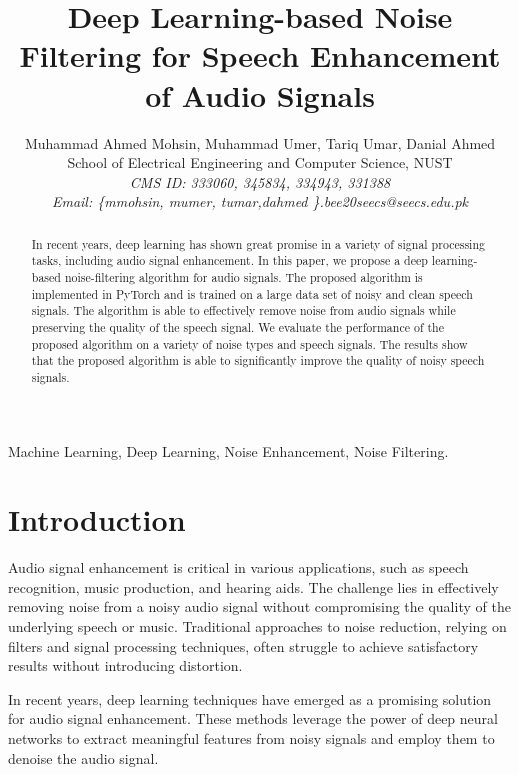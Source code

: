 \documentclass[conference]{IEEEtran}
\begin{document}
\title{Deep Learning-based Noise Filtering for Speech Enhancement of Audio Signals}

\author{Muhammad Ahmed Mohsin, Muhammad Umer, Tariq Umar, Danial Ahmed\\
	School of Electrical Engineering and Computer Science, NUST\\
	\textit{CMS ID: 333060, 345834, 334943, 331388}\\
	\textit{Email: \{mmohsin, mumer, tumar,dahmed \}.bee20seecs@seecs.edu.pk}
}

\maketitle

\begin{abstract}
In recent years, deep learning has shown great promise in a variety of signal processing tasks, including audio signal enhancement. In this paper, we propose a deep learning-based noise-filtering algorithm for audio signals. The proposed algorithm is implemented in PyTorch and is trained on a large data set of noisy and clean speech signals. The algorithm is able to effectively remove noise from audio signals while preserving the quality of the speech signal. We evaluate the performance of the proposed algorithm on a variety of noise types and speech signals. The results show that the proposed algorithm is able to significantly improve the quality of noisy speech signals.
\end{abstract}

\begin{IEEEkeywords}
Machine Learning, Deep Learning, Noise Enhancement, Noise Filtering.
\end{IEEEkeywords}

\section{Introduction}
Audio signal enhancement is critical in various applications, such as speech recognition, music production, and hearing aids. The challenge lies in effectively removing noise from a noisy audio signal without compromising the quality of the underlying speech or music. Traditional approaches to noise reduction, relying on filters and signal processing techniques, often struggle to achieve satisfactory results without introducing distortion. 

In recent years, deep learning techniques have emerged as a promising solution for audio signal enhancement. These methods leverage the power of deep neural networks to extract meaningful features from noisy signals and employ them to denoise the audio signal.
\end{document}
